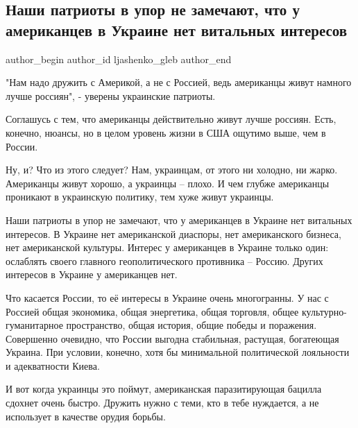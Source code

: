  
 
 
 
 
 
\subsection{Наши патриоты в упор не замечают, что у американцев в Украине нет витальных интересов}
\label{sec:27_08_2021.fb.ljashenko_gleb.1.patrioty_amerika_rossia}
 
\ifcmt
 author_begin
   author_id ljashenko_gleb
 author_end
\fi

"Нам надо дружить с Америкой, а не с Россией, ведь американцы живут намного
лучше россиян", - уверены украинские патриоты.

Соглашусь с тем, что американцы действительно живут лучше россиян. Есть,
конечно, нюансы, но в целом уровень жизни в США ощутимо выше, чем в России. 

Ну, и? Что из этого следует? Нам, украинцам, от этого ни холодно, ни жарко.
Американцы живут хорошо, а украинцы – плохо. И чем глубже американцы проникают
в украинскую политику, тем хуже живут украинцы. 

Наши патриоты в упор не замечают, что у американцев в Украине нет витальных
интересов. В Украине нет американской диаспоры, нет американского бизнеса, нет
американской культуры. Интерес у американцев в Украине только один: ослаблять
своего главного геополитического противника – Россию. Других интересов в
Украине у американцев нет.

Что касается России, то её интересы в Украине очень многогранны. У нас с
Россией общая экономика, общая энергетика, общая торговля, общее
культурно-гуманитарное пространство, общая история, общие победы и поражения.
Совершенно очевидно, что России выгодна стабильная, растущая, богатеющая
Украина. При условии, конечно, хотя бы минимальной политической лояльности и
адекватности Киева.

И вот когда украинцы это поймут, американская паразитирующая бацилла сдохнет
очень быстро. Дружить нужно с теми, кто в тебе нуждается, а не использует в
качестве орудия борьбы.

